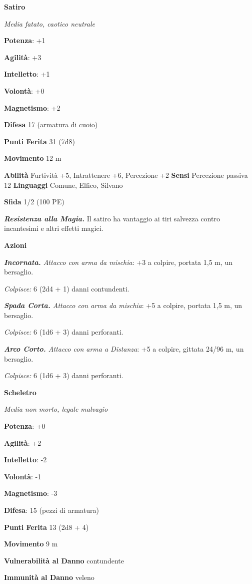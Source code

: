 \begin{multicols}{2}
\textbf{Satiro}

\emph{Media fatato, caotico neutrale}

\textbf{Potenza}: +1

\textbf{Agilità}: +3

\textbf{Intelletto}: +1

\textbf{Volontà}: +0

\textbf{Magnetismo}: +2

\textbf{Difesa} 17 (armatura di cuoio)

\textbf{Punti Ferita} 31 (7d8)

\textbf{Movimento} 12 m

\textbf{Abilità} Furtività +5, Intrattenere +6, Percezione +2
\textbf{Sensi} Percezione passiva 12 \textbf{Linguaggi} Comune, Elfico,
Silvano

\textbf{Sfida} 1/2 (100 PE)

\emph{\textbf{Resistenza alla Magia.}} Il satiro ha vantaggio ai tiri
salvezza contro incantesimi e altri effetti magici.

\textbf{Azioni}

\emph{\textbf{Incornata.} Attacco con arma da mischia}: +3 a colpire,
portata 1,5 m, un bersaglio.

\emph{Colpisce:} 6 (2d4 + 1) danni contundenti.

\emph{\textbf{Spada Corta.} Attacco con arma da mischia}: +5 a colpire,
portata 1,5 m, un bersaglio.

\emph{Colpisce:} 6 (1d6 + 3) danni perforanti.

\emph{\textbf{Arco Corto.} Attacco con arma a Distanza}: +5 a colpire,
gittata 24/96 m, un bersaglio.

\emph{Colpisce:} 6 (1d6 + 3) danni perforanti.

\textbf{Scheletro}

\emph{Media non morto, legale malvagio}

\textbf{Potenza}: +0

\textbf{Agilità}: +2

\textbf{Intelletto}: -2

\textbf{Volontà}: -1

\textbf{Magnetismo}: -3

\textbf{Difesa}: 15 (pezzi di armatura)

\textbf{Punti Ferita} 13 (2d8 + 4)

\textbf{Movimento} 9 m

\textbf{Vulnerabilità al Danno} contundente

\textbf{Immunità al Danno} veleno


\end{multicols}
